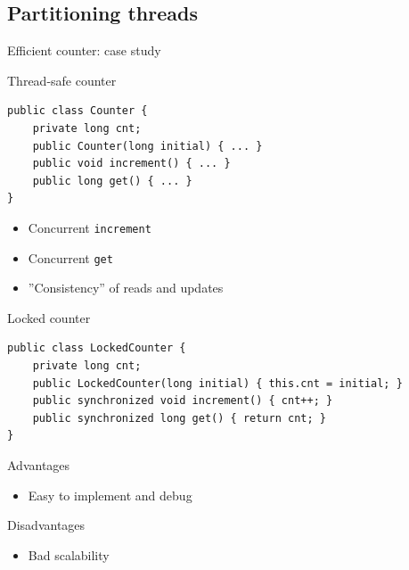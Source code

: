 \subsection{Partitioning threads}
\showTOCSub

\begin{frame}[fragile]{Efficient counter: case study}

Thread-safe counter
\begin{verbatim}
public class Counter {
    private long cnt;
    public Counter(long initial) { ... }
    public void increment() { ... }
    public long get() { ... }
}
\end{verbatim}

\begin{itemize}
    \item Concurrent \texttt{increment}
    \item Concurrent \texttt{get}
    \item ''Consistency'' of reads and updates
\end{itemize}
\end{frame}

\begin{frame}[fragile]{Locked counter}

\begin{verbatim}
public class LockedCounter {
    private long cnt;
    public LockedCounter(long initial) { this.cnt = initial; }
    public synchronized void increment() { cnt++; }
    public synchronized long get() { return cnt; }
}
\end{verbatim}

Advantages
\begin{itemize}
    \item Easy to implement and debug
\end{itemize}

Disadvantages
\begin{itemize}
    \item Bad scalability 
\end{itemize}
\end{frame}



